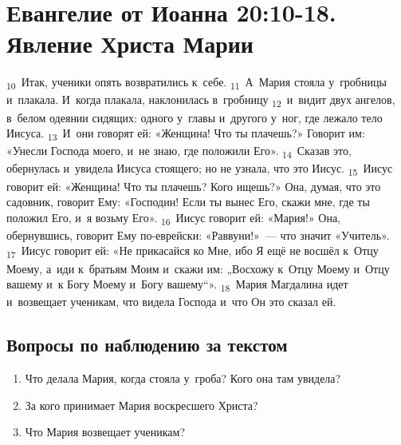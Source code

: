 \documentclass[a4paper,12pt]{article}
\begin{document}

\section{Евангелие от Иоанна 20:10-18. Явление Христа Марии}

\textsubscript{10}~Итак, ученики опять возвратились к~себе. \textsubscript{11}~А~Мария стояла у~гробницы и~плакала. И~когда плакала, наклонилась в~гробницу \textsubscript{12}~и~видит двух ангелов, в~белом одеянии сидящих: одного у~главы и~другого у~ног, где лежало тело Иисуса. \textsubscript{13}~И~они говорят ей: «Женщина! Что ты плачешь?» Говорит им: «Унесли Господа моего, и~не знаю, где положили Его». \textsubscript{14}~Сказав это, обернулась и~увидела Иисуса стоящего; но не узнала, что это Иисус. \textsubscript{15}~Иисус говорит ей: «Женщина! Что ты плачешь? Кого ищешь?» Она, думая, что это садовник, говорит Ему: «Господин! Если ты вынес Его, скажи мне, где ты положил Его, и~я возьму Его». \textsubscript{16}~Иисус говорит ей: «Мария!» Она, обернувшись, говорит Ему по-еврейски: «Раввуни!»~--- что значит «Учитель». \textsubscript{17}~Иисус говорит ей: «Не прикасайся ко Мне, ибо Я ещё не восшёл к~Отцу Моему, а~иди к~братьям Моим и~скажи им: „Восхожу к~Отцу Моему и~Отцу вашему и~к Богу Моему и~Богу вашему“». \textsubscript{18}~Мария Магдалина идет и~возвещает ученикам, что видела Господа и~что Он это сказал ей. 

\subsection*{Вопросы по наблюдению за текстом}
\begin{enumerate}
    \item Что делала Мария, когда стояла у~гроба? Кого она там увидела? 
    
    \myline
    
    \myline
    \item За кого принимает Мария воскресшего Христа? 
    
    \myline
    
    \myline
    \item Что Мария возвещает ученикам? 
    
    \myline
    
    \myline
\end{enumerate}
\end{document}
